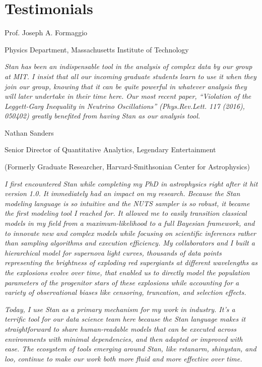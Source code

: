 \documentclass[12pt, oneside]{article}
\begin{document}
\pagebreak

\section*{Testimonials}

\noindent Prof. Joseph A. Formaggio

\noindent Physics Department, Massachusetts Institute of Technology

\textit{
Stan has been an indispensable tool in the analysis of complex data by our group at MIT.  
I insist that all our incoming graduate students learn to use it when they join our group, 
knowing that it can be quite powerful in whatever analysis they will later undertake in their 
time here.  Our most recent paper, ``Violation of the Leggett-Garg Inequality in Neutrino 
Oscillations'' (Phys.Rev.Lett. 117 (2016), 050402) greatly benefited from having Stan as 
our analysis tool.}

\vspace{10mm}

\noindent Nathan Sanders

\noindent Senior Director of Quantitative Analytics, Legendary Entertainment

\noindent (Formerly Graduate Researcher, Harvard-Smithsonian Center for Astrophysics)


\textit{
I first encountered Stan while completing my PhD in
astrophysics right after it hit version 1.0.  It immediately had an
impact on my research.  Because the Stan modeling language is so
intuitive and the NUTS sampler is so robust, it became the first
modeling tool I reached for.  It allowed me to easily transition
classical models in my field from a maximum-likelihood to a full
Bayesian framework, and to innovate new and complex models while
focusing on scientific inferences rather than sampling algorithms and
execution efficiency.  My collaborators and I built a hierarchical
model for supernova light curves, thousands of data points
representing the brightness of exploding red supergiants at different
wavelengths as the explosions evolve over time, that enabled us to
directly model the population parameters of the progenitor stars of
these explosions while accounting for a variety of observational
biases like censoring, truncation, and selection effects.}

\textit{
Today, I use Stan as a primary mechanism for my work in industry.
It's a terrific tool for our data science team here because the Stan
language makes it straightforward to share human-readable models that
can be executed across environments with minimal dependencies, and
then adapted or improved with ease.  The ecosystem of tools emerging
around Stan, like rstanarm, shinystan, and loo, continue to make our
work both more fluid and more effective over time.}
\end{document}
